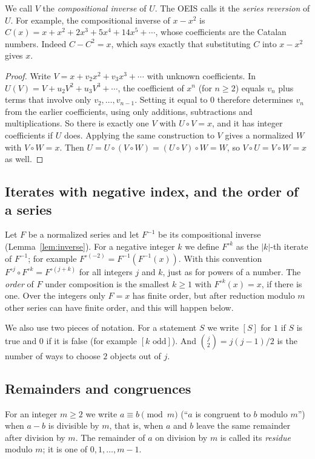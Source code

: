 \documentclass[11pt,a4paper]{article}
\theoremstyle{definition}
\theoremstyle{remark}
\begin{document}
We call $V$ the \emph{compositional inverse} of $U$. The OEIS calls it the \emph{series reversion} of $U$. For example,
the compositional inverse of $x-x^2$ is $C(x)=x+x^2+2x^3+5x^4+14x^5+\cdots$, whose coefficients are the Catalan numbers.
Indeed $C-C^2=x$, which says exactly that substituting $C$ into $x-x^2$ gives $x$.

\begin{proof}
Write $V=x+v_2x^2+v_3x^3+\cdots$ with unknown coefficients. In
$U(V)=V+u_2V^2+u_3V^3+\cdots$, the coefficient of $x^n$ (for $n\ge2$) equals $v_n$ plus terms that involve only
$v_2,\dots,v_{n-1}$. Setting it equal to $0$ therefore determines $v_n$ from the earlier coefficients, using only
additions, subtractions and multiplications. So there is exactly one $V$ with $U\circ V=x$, and it has integer
coefficients if $U$ does. Applying the same construction to $V$ gives a normalized $W$ with $V\circ W=x$. Then
$U=U\circ(V\circ W)=(U\circ V)\circ W=W$, so $V\circ U=V\circ W=x$ as well.
\end{proof}

\subsection{Iterates with negative index, and the order of a series}
Let $F$ be a normalized series and let $F^{-1}$ be its compositional inverse (Lemma~\ref{lem:inverse}). For a
negative integer $k$ we define $F^{\circ k}$ as the $|k|$-th iterate of $F^{-1}$; for example
$F^{\circ(-2)}=F^{-1}(F^{-1}(x))$. With this convention $F^{\circ j}\circ F^{\circ k}=F^{\circ(j+k)}$ for all integers
$j$ and $k$, just as for powers of a number. The \emph{order} of $F$ under composition is the smallest $k\ge1$ with
$F^{\circ k}(x)=x$, if there is one. Over the integers only $F=x$ has finite order, but after reduction modulo $m$
other series can have finite order, and this will happen below.

We also use two pieces of notation. For a statement $S$ we write $[S]$ for $1$ if $S$ is true and $0$ if it is false
(for example $[k\text{ odd}]$). And $\binom{j}{2}=j(j-1)/2$ is the number of ways to choose $2$ objects out of $j$.

\subsection{Remainders and congruences}
For an integer $m\ge2$ we write $a\equiv b\pmod m$ (``$a$ is congruent to $b$ modulo $m$'') when $a-b$ is divisible by
$m$, that is, when $a$ and $b$ leave the same remainder after division by $m$. The remainder of $a$ on division by
$m$ is called its \emph{residue} modulo $m$; it is one of $0,1,\dots,m-1$.
\end{document}
